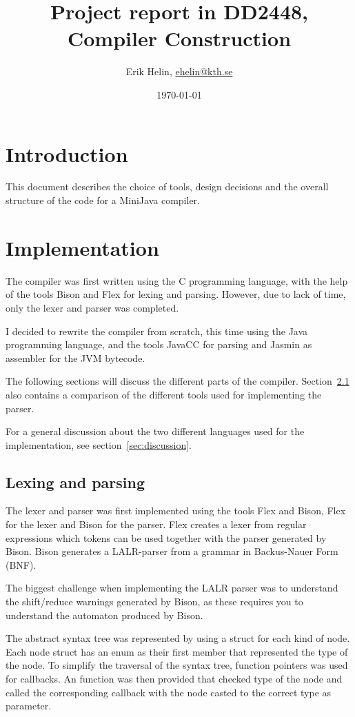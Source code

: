 \documentclass[11pt,oneside,a4paper]{article}
\begin{document}
\title{Project report in DD2448, Compiler Construction}
\author{Erik Helin, \href{mailto:ehelin@kth.se}{ehelin@kth.se}}
\date{\today}
\maketitle

\tableofcontents

\section{Introduction}
This document describes the choice of tools, design decisions and the overall 
structure of the code for a MiniJava compiler.
\section{Implementation}
The compiler was first written using the C programming language, with the help
of the tools Bison and Flex for lexing and parsing. However, due to lack of
time, only the lexer and parser was completed. 

I decided to rewrite the compiler from scratch, this time using the Java
programming language, and the tools JavaCC for parsing and Jasmin as assembler
for the JVM bytecode.

The following sections will discuss the different parts of the compiler.
Section~\ref{sec:lexing_and_parsing} also contains a comparison of the
different tools used for implementing the parser.

For a general discussion about the two different languages used for the
implementation, see section~\ref{sec:discussion}.
\subsection{Lexing and parsing}
\label{sec:lexing_and_parsing}
The lexer and parser was first implemented using the tools Flex and Bison, Flex
for the lexer and Bison for the parser. Flex creates a lexer from regular
expressions which tokens can be used together with the parser generated by
Bison. Bison generates a LALR-parser from a grammar in Backus-Nauer Form (BNF). 

The biggest challenge when implementing the LALR parser was to understand
the shift/reduce warnings generated by Bison, as these requires you to
understand the automaton produced by Bison.

The abstract syntax tree was represented by using a struct for each kind of
node. Each node struct has an enum as their first member that represented 
the type of the node. To simplify the traversal of the syntax tree, 
function pointers was used for callbacks. An function was then provided that 
checked type of the node and called the corresponding callback with the node
casted to the correct type as parameter.
\end{document}
